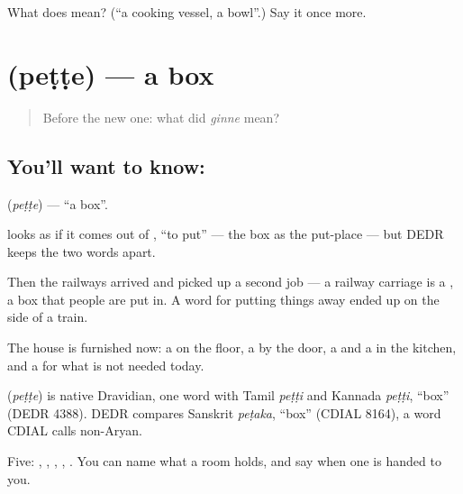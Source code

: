\begin{tcolorbox}[breakable,colback=teal!4,colframe=teal!35!black,title={Before you move on}]
What does  mean? (\textquotedblleft{}a cooking vessel, a bowl\textquotedblright{}.) Say it once more.
\end{tcolorbox}
\section[\texorpdfstring{\te{పెట్టె} (peṭṭe)}{పెట్టె (peṭṭe)}]{ (peṭṭe) — a box}

\label{lesson:TE-C56-box}



\begin{quote}
Before the new one: what did \emph{ginne} mean?
\end{quote}

\subsection*{You'll want to know: }
\textbf{} (\emph{peṭṭe}) — \textquotedblleft{}a box\textquotedblright{}.

 looks as if it comes out of , \textquotedblleft{}to put\textquotedblright{} — the box as the put-place — but DEDR keeps the two words apart.

Then the railways arrived and  picked up a second job — a railway carriage is a , a box that people are put in. A word for putting things away ended up on the side of a train.

The house is furnished now: a  on the floor, a  by the door, a  and a  in the kitchen, and a  for what is not needed today.

\begin{cousinweb}
\textbf{} (\emph{peṭṭe}) is native Dravidian, one word with Tamil \emph{peṭṭi} and Kannada \emph{peṭṭi}, \textquotedblleft{}box\textquotedblright{} (DEDR 4388). DEDR compares Sanskrit \emph{peṭaka}, \textquotedblleft{}box\textquotedblright{} (CDIAL 8164), a word CDIAL calls non-Aryan.
\end{cousinweb}

\begin{grammarlens}[title={What you've built}]
Five: , , , , . You can name what a room holds, and say  when one is handed to you.
\end{grammarlens}

